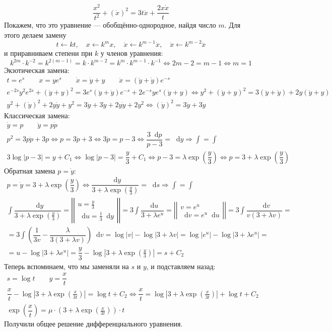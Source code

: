 \documentclass[a4paper,12pt]{article}
\renewcommand*\d{\mathop{}\!\mathrm{d}}
\newcommand{\dy}{\dot{y}}
\newcommand{\ddy}{\ddot{y}}
\newcommand{\dpp}{\dot{p}}
\newcommand{\dx}{\dot{x}}
\newcommand{\ddx}{\ddot{x}}
\newcommand{\bto}{\Longrightarrow}
\newcommand{\ds}{\displaystyle}
\begin{document}
\[\dfrac{x^2}{t^2} + (\dx)^2 = 3t\ddx + \dfrac{2x\dx}{t}\]
Покажем, что это уравнение --- обобщённо-однородное, найдя число $m$. Для этого делаем замену 
\[t\leftarrow kt,\quad x \leftarrow k^mx,\quad \dx \leftarrow k^{m - 1}\dx,\quad \ddx \leftarrow k^{m - 2}\ddx\]
и приравниваем степени при $k$ у членов уравнения:
\[k^{2m} \cdot k^{-2} = k^{2(m - 1)} = k\cdot k^{m - 2} = k^{m} \cdot k^{m - 1}\cdot k^{-1} \iff 2m - 2 = m - 1 \iff m = 1\]
Экзотическая замена:
\begin{gather*}
	t = e^s\qquad x = ye^s \qquad \dx = \dy + y \qquad \ddx = \left(\ddy + \dy\right)e^{-s}\\
	e^{-2s}y^2e^{2s} + (\dy + y)^2 = 3e^s\left(\ddy + \dy\right)e^{-s} + 2e^{-s}ye^s(\dy + y) \iff y^2 + (\dy + y)^2 = 3(\ddy + \dy) + 2y(\dy + y)\\
	y^2 + (\dy)^2 + 2y\dy + y^2 = 3\ddy + 3\dy + 2y\dy + 2y^2 \iff (\dy)^2 = 3\ddy + 3\dy 
\end{gather*}
Классическая замена:
\begin{gather*}
	\dy = p \qquad \ddy = p\dpp\\
	p^2 = 3p\dpp + 3p \iff p = 3\dpp + 3 \iff 3\dpp = p - 3 \iff \dfrac{3\d p}{p - 3} = \d y \bto \ds\int = \int\\
	3\log|p - 3| = y + C_1 \iff \log|p - 3| = \dfrac{y}{3} + C_1 \iff p - 3 = \lambda \exp(\dfrac{y}{3}) \iff p = 3 + \lambda \exp(\dfrac{y}{3})
\end{gather*}
Обратная замена $p = \dy$:
\begin{gather*}
	p = \dy = 3 + \lambda \exp(\dfrac{y}{3}) \iff \dfrac{\d y}{3 + \lambda \exp(\frac{y}{3})} = \d s \bto \ds\int = \int\\
	\ds\int \dfrac{\d y}{3 + \lambda \exp(\frac{y}{3})} = \left|\left|\begin{gathered}
		u = \frac{y}{3}\\
		\d u = \frac{1}{3}\d y
	\end{gathered}\right|\right| = 3\ds\int\dfrac{\d u}{3 + \lambda e^u} = \left|\left|\begin{gathered}
		v = e^u\\
		\d v = e^u\d u
	\end{gathered}\right|\right| = 3\ds\int\dfrac{\d v}{v(3 + \lambda v)} = \\
	= 3\ds\int \left(\dfrac{1}{3v} - \dfrac{\lambda}{3(3 + \lambda v)}\right)\d v = \log|v| - \log|3 + \lambda v|  = \log|e^u| - \log|3 + \lambda e^u|  = \\
	= u - \log|3 + \lambda e^u|  = \dfrac{y}{3} - \log\left|3 + \lambda\exp(\frac{y}{3})\right| = s + C_2
\end{gather*}
Теперь вспоминаем, что мы заменяли на $s$ и $y$, и подставляем назад:
\begin{gather*}
	s = \log t \qquad y = \dfrac{x}{t}\\
	\dfrac{x}{t} - \log\left|3 + \lambda\exp(\frac{x}{3t})\right| = \log t + C_2 \iff \dfrac{x}{t} = \log\left|3 + \lambda\exp(\frac{x}{3t})\right| + \log t + C_2\\
	\exp(\dfrac{x}{t}) = \mu \cdot \left(3 + \lambda\exp(\frac{x}{3t})\right)\cdot t
\end{gather*}
Получили общее решение дифференциального уравнения.
\end{document}
